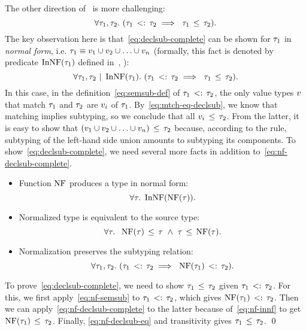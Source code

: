 The other direction of~ is more challenging: 
\begin{equation}\label{eq:declsub-complete}
\forall \ty_1, \ty_2.\ 
(\bjsemsub{\ty_1}{\ty_2} \implies\ \bjsub{\ty_1}{\ty_2}).
\end{equation}
The key observation here is that~\eqref{eq:declsub-complete} can be shown 
for $\tau_1$ in \emph{normal form},
i.e. $\tau_1 \equiv v_1 \cup v_2 \cup \ldots \cup v_n$
(formally, this fact is denoted by predicate $\mathop{\mathrm{InNF}}(\tau_1)$ 
defined in~, ):
\begin{equation}\label{eq:nf-declsub-complete}
\forall \tau_1, \tau_2 ~\vert~ \mathop{\mathrm{InNF}}(\tau_1).\
(\tau_1 \, <: \, \tau_2 \implies\ \tau_1 \, \leq \, \tau_2).
\end{equation}
In this case, in the definition~\eqref{eq:semsub-def}
of $\tau_1 \, <: \, \tau_2$, the only
value types $v$ that match $\tau_1$ and $\tau_2$ are $v_i$ of $\tau_1$. 
By~\eqref{eq:mtch-eq-declsub}, we know that matching implies subtyping,
so we conclude that all $v_i \, \leq \, \tau_2$.
From the latter, it is easy to show that 
$(v_1 \cup v_2 \cup \ldots \cup v_n) \, \leq \, \tau_2$ because,
according to the \RD{UnionL} rule,
subtyping of the left-hand side union amounts to subtyping its components.
To show~\eqref{eq:declsub-complete}, we need several more facts
in addition to~\eqref{eq:nf-declsub-complete}.
\begin{itemize}
  \item Function $\mathop{\mathrm{NF}}$ produces a type in normal form:
	\begin{equation}\label{eq:nf-innf}
	\forall \tau.\ \mathop{\mathrm{InNF}}(\mathop{\mathrm{NF}}(\tau)).
	\end{equation}
  \item Normalized type is equivalent to the source type:
    \begin{equation}\label{eq:nf-declsub-eq}
    \forall \ty.\;\ \bjsub{\NF(\ty)}{\ty}\ \land\ \bjsub{\ty}{\NF(\ty)}.
    \end{equation}
  \item Normalization preserves the subtyping relation:
    \begin{equation}\label{eq:nf-semsub}
    \forall \ty_1, \ty_2.\ 
    (\bjsemsub{\ty_1}{\ty_2} \implies\ \bjsemsub{\NF(\ty_1)}{\ty_2}).
    \end{equation}
\end{itemize}
To prove~\eqref{eq:declsub-complete}, we need to show $\tau_1 \, \leq \, \tau_2$
given $\tau_1 \, <: \, \tau_2$. 
For this, we first apply~\eqref{eq:nf-semsub} to $\tau_1 \, <: \, \tau_2$,
which gives $\mathop{\mathrm{NF}}(\tau_1) \, <: \, \tau_2$. 
Then we can apply~\eqref{eq:nf-declsub-complete} to the latter
because of~\eqref{eq:nf-innf} to get $\mathop{\mathrm{NF}}(\tau_1) \, \leq \, \tau_2$.
Finally, \eqref{eq:nf-declsub-eq} and transitivity 
gives $\tau_1 \, \leq \, \tau_2$. \qed

